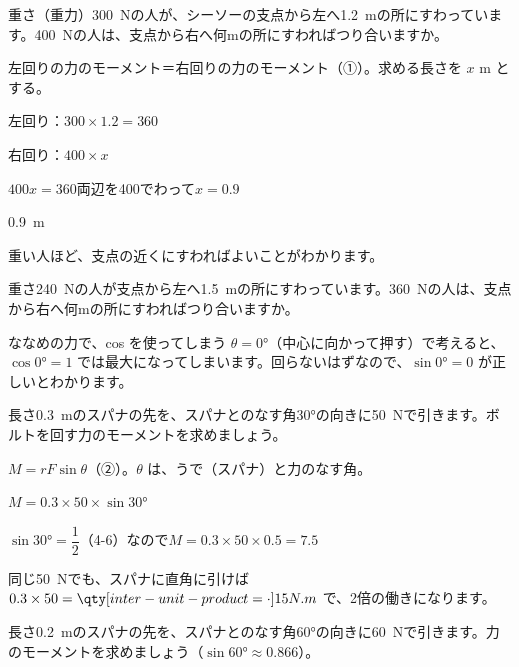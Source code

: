 \begin{reidai}[シーソーのつり合い]
重さ（重力）\qty{300}{N}の人が、シーソーの支点から左へ\qty{1.2}{m}の所にすわっています。\qty{400}{N}の人は、支点から右へ何mの所にすわればつり合いますか。\par
\kangaekata 左回りの力のモーメント＝右回りの力のモーメント（①）。求める長さを $x$ m とする。\par
\shiki 左回り：$300\times1.2=360$\par
\hspace*{2.6\zw}右回り：$400\times x$\par
\hspace*{2.6\zw}$400x=360$\quad 両辺を400でわって\quad $x=0.9$\par
\kotae \qty{0.9}{m}
\end{reidai}
重い人ほど、支点の近くにすわればよいことがわかります。

\begin{jibun}
重さ\qty{240}{N}の人が支点から左へ\qty{1.5}{m}の所にすわっています。\qty{360}{N}の人は、支点から右へ何mの所にすわればつり合いますか。
\end{jibun}

\begin{tsumazuki}{ななめの力で、cos を使ってしまう}
$\theta=0°$（中心に向かって押す）で考えると、$\cos0°=1$ では最大になってしまいます。回らないはずなので、$\sin0°=0$ が正しいとわかります。
\end{tsumazuki}

\begin{reidai}[ななめの力のモーメント]
長さ\qty{0.3}{m}のスパナの先を、スパナとのなす角30°の向きに\qty{50}{N}で引きます。ボルトを回す力のモーメントを求めましょう。\par
\kangaekata $M=rF\sin\theta$（②）。$\theta$ は、うで（スパナ）と力のなす角。\par
\shiki $M=0.3\times50\times\sin30°$\par
\hspace*{2.6\zw}$\sin30°=\dfrac{1}{2}$（4-6）なので\quad $M=0.3\times50\times0.5=7.5$\par
\kotae {}
\end{reidai}
同じ\qty{50}{N}でも、スパナに直角に引けば $0.3\times50=\bkivoNm{15}$ で、2倍の働きになります。

\begin{jibun}
長さ\qty{0.2}{m}のスパナの先を、スパナとのなす角60°の向きに\qty{60}{N}で引きます。力のモーメントを求めましょう（$\sin60°\approx0.866$）。
\end{jibun}

